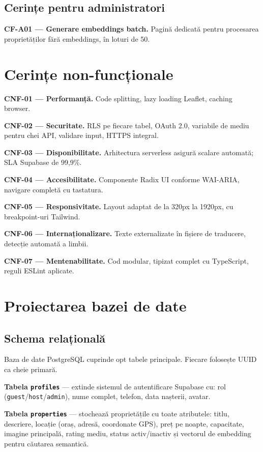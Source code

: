\documentclass[12pt,a4paper,oneside]{report}
\begin{document}
\subsection{Cerințe pentru administratori}

\textbf{CF-A01 — Generare embeddings batch.} Pagină dedicată pentru procesarea proprietăților fără embeddings, în loturi de 50.


\section{Cerințe non-funcționale}

\textbf{CNF-01 — Performanță.} Code splitting, lazy loading Leaflet, caching browser.

\textbf{CNF-02 — Securitate.} RLS pe fiecare tabel, OAuth 2.0, variabile de mediu pentru chei API, validare input, HTTPS integral.

\textbf{CNF-03 — Disponibilitate.} Arhitectura serverless asigură scalare automată; SLA Supabase de 99,9\%.

\textbf{CNF-04 — Accesibilitate.} Componente Radix UI conforme WAI-ARIA, navigare completă cu tastatura.

\textbf{CNF-05 — Responsivitate.} Layout adaptat de la 320px la 1920px, cu breakpoint-uri Tailwind.

\textbf{CNF-06 — Internaționalizare.} Texte externalizate în fișiere de traducere, detecție automată a limbii.

\textbf{CNF-07 — Mentenabilitate.} Cod modular, tipizat complet cu TypeScript, reguli ESLint aplicate.


\section{Proiectarea bazei de date}

\subsection{Schema relațională}

Baza de date PostgreSQL cuprinde opt tabele principale. Fiecare folosește UUID ca cheie primară.

\textbf{Tabela \texttt{profiles}} — extinde sistemul de autentificare Supabase cu: rol (\texttt{guest}/\texttt{host}/\texttt{admin}), nume complet, telefon, data nașterii, avatar.

\textbf{Tabela \texttt{properties}} — stochează proprietățile cu toate atributele: titlu, descriere, locație (oraș, adresă, coordonate GPS), preț pe noapte, capacitate, imagine principală, rating mediu, status activ/inactiv și vectorul de embedding pentru căutarea semantică.
\end{document}
